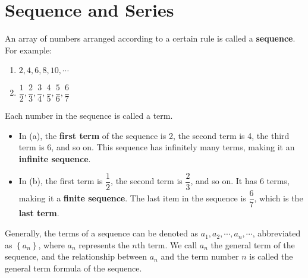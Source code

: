 \documentclass{report}
\begin{document}
\pagestyle{fancy}
\fancyhead{} %
\fancyhead[RO,LE]{\thepage}
\fancyhead[LO,RE]{\leftmark}
\fancyfoot{} %

\fancyfoot[RO,RE]{\thepage}

\onehalfspacing
\setcounter{chapter}{12}

\chapter{Sequence and Series}

An array of numbers arranged according to a certain rule is called a \textbf{sequence}. For example:
\vspace{-1em}
\begin{enumerate}[label=(\alph*),leftmargin=*]
    \item $2,4,6,8,10, \cdots$
    \item $\dfrac{1}{2}, \dfrac{2}{3}, \dfrac{3}{4}, \dfrac{4}{5}, \dfrac{5}{6}, \dfrac{6}{7}$
\end{enumerate}
\vspace{-0.5em}
Each number in the sequence is called a term. 
\vspace{-1em}
\begin{itemize}[leftmargin=*]
    \item In (a), the \textbf{first term} of the sequence is 2, the second term is 4, the third term is 6, and so on. This sequence has infinitely many terms, making it an \textbf{infinite sequence}.
    \item In (b), the first term is $\dfrac{1}{2}$, the second term is $\dfrac{2}{3}$, and so on. It has 6 terms, making it a \textbf{finite sequence}. The last item in the sequence is $\dfrac{6}{7}$, which is the \textbf{last term}.
\end{itemize}

\vspace{-1em}
Generally, the terms of a sequence can be denoted as $a_{1}, a_{2}, \cdots, a_{n}, \cdots$, abbreviated as $\left\{a_{n}\right\}$, where $a_{n}$ represents the $n$th term. We call $a_{n}$ the general term of the sequence, and the relationship between $a_{n}$ and the term number $n$ is called the general term formula of the sequence.
\end{document}
